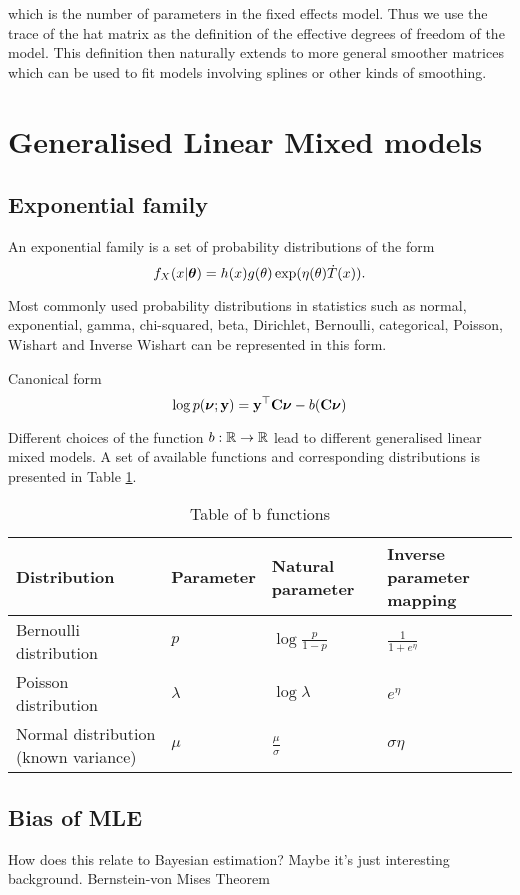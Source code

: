 \documentclass{amsart}[12pt]
\begin{document}
which is the number of parameters in the fixed effects model. Thus we use the trace of the hat matrix as
the definition of the effective degrees of freedom of the model. This definition then naturally extends to
more general smoother matrices which can be used to fit models involving splines or other kinds of smoothing.

\section{Generalised Linear Mixed models}

\subsection{Exponential family}

An exponential family is a set of probability distributions of the form
$$
f_X(x|{\boldsymbol \theta}) = h(x) g(\theta) \exp(\eta(\theta) \dot T(x)).
$$

Most commonly used probability distributions in statistics such as normal, exponential, gamma,
chi-squared, beta, Dirichlet, Bernoulli, categorical, Poisson, Wishart and Inverse Wishart can
be represented in this form.

Canonical form
$$
\log p({\boldsymbol \nu}; {\bf y}) = {\bf y}^\top {\bf C} {\boldsymbol\nu} - b({\bf C} {\boldsymbol \nu})
$$

Different choices of the function $b:{\mathbb{R}} \to {\mathbb{R}}$ lead to different generalised linear mixed models. A set
of available functions and corresponding distributions is presented in Table \ref{tab:b_functions}.

\begin{table}
\caption{Table of b functions}
\label{tab:b_functions}
\begin{tabular}{|l|lll|}
\hline
Distribution & Parameter & Natural parameter & Inverse parameter mapping \\
\hline
Bernoulli distribution & $p$ & $\log{\frac{p}{1 - p}}$ & $\frac{1}{1 + e^\eta}$ \\
Poisson distribution & $\lambda$ & $\log \lambda$ & $e^\eta$ \\
Normal distribution (known variance) & $\mu$ & $\frac{\mu}{\sigma}$ & $\sigma \eta$ \\
\hline
\end{tabular}
\end{table}

\subsection{Bias of MLE}

How does this relate to Bayesian estimation? Maybe it's just interesting background.
Bernstein-von Mises Theorem


% 

\end{document}
